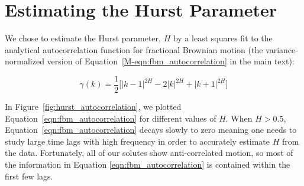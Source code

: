 \documentclass{article}
\begin{document}

  \newpage
  
  \section{Estimating the Hurst Parameter}\label{section:H_estimate}
  
  We chose to estimate the Hurst parameter, $H$ by a least squares fit to the analytical
  autocorrelation function for fractional Brownian motion (the variance-normalized version 
  of Equation~\ref{M-eqn:fbm_autocorrelation} in the main text):
  
  \begin{equation}
    \gamma(k) = \dfrac{1}{2}\bigg[|k-1|^{2H} - 2|k|^{2H} + |k+1|^{2H}\bigg]
  \label{eqn:fbm_autocorrelation}
  \end{equation}  
  
  In Figure~\ref{fig:hurst_autocorrelation}, we plotted Equation~\ref{eqn:fbm_autocorrelation}
  for different values of $H$. When $H > 0.5$, Equation~\ref{eqn:fbm_autocorrelation} decays
  slowly to zero meaning one needs to study large time lags with high frequency in order to
  accurately estimate $H$ from the data. Fortunately, all of our solutes show anti-correlated
  motion, so most of the information in Equation \ref{eqn:fbm_autocorrelation} is contained
  within the first few lags. 
\end{document}
